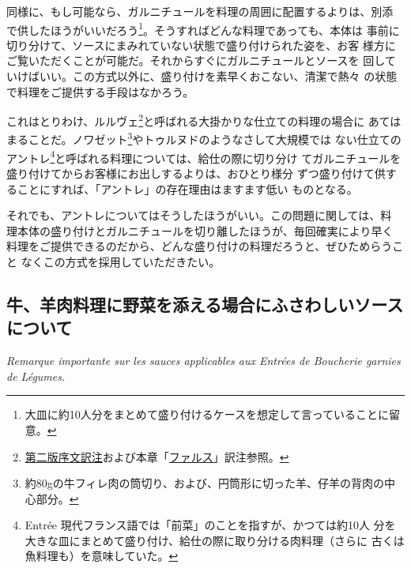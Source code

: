 同様に、もし可能なら、ガルニチュールを料理の周囲に配置するよりは、別添
で供したほうがいいだろう\footnote{大皿に約10人分をまとめて盛り付けるケースを想定して言っていることに留意。}。そうすればどんな料理であっても、本体は
事前に切り分けて、ソースにまみれていない状態で盛り付けられた姿を、お客
様方にご覧いただくことが可能だ。それからすぐにガルニチュールとソースを
回していけばいい。この方式以外に、盛り付けを素早くおこない、清潔で熱々
の状態で料理をご提供する手段はなかろう。

これはとりわけ、ルルヴェ\footnote{\protect\hyperlink{releve}{第二版序文訳注}および本章「\protect\hyperlink{farces}{ファルス}」訳注参照。}と呼ばれる大掛かりな仕立ての料理の場合に
あてはまることだ。ノワゼット\footnote{約80gの牛フィレ肉の筒切り、および、円筒形に切った羊、仔羊の背肉の中心部分。}やトゥルヌドのようなさして大規模では
ない仕立てのアントレ\footnote{Entrée
  現代フランス語では「前菜」のことを指すが、かつては約10人
  分を大きな皿にまとめて盛り付け、給仕の際に取り分ける肉料理（さらに
  古くは魚料理も）を意味していた。}と呼ばれる料理については、給仕の際に切り分け
てガルニチュールを盛り付けてからお客様にお出しするよりは、おひとり様分
ずつ盛り付けて供することにすれば、「アントレ」の存在理由はますます低い
ものとなる。

それでも、アントレについてはそうしたほうがいい。この問題に関しては、料
理本体の盛り付けとガルニチュールを切り離したほうが、毎回確実により早く
料理をご提供できるのだから、どんな盛り付けの料理だろうと、ぜひためらうこと
なくこの方式を採用していただきたい。

\hypertarget{remarque-importante-sur-les-sauces-applicables-aux-entrees-de-boucherie-garnie-de-legumes}{%
\subsection{牛、羊肉料理に野菜を添える場合にふさわしいソースについて}\label{remarque-importante-sur-les-sauces-applicables-aux-entrees-de-boucherie-garnie-de-legumes}}

\vspace{-1\zw}
\begin{center}
\textit{Remarque importante sur les sauces applicables aux Entrées de Boucherie garnies de Légumes.}
\end{center}

